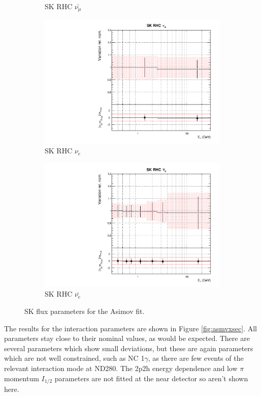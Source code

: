 \begin{figure}[!htbp]
\begin{subfigure}{0.45\textwidth}
  \caption{SK RHC $\bar{\nu_{\mu}}$}
\end{subfigure}
\begin{subfigure}{0.45\textwidth}
  \centering
  \includegraphics[width=0.75\linewidth]{figs/asmvfluxpoly14}
  \caption{SK RHC $\nu_{e}$}
\end{subfigure}
\begin{subfigure}{0.45\textwidth}
  \centering
  \includegraphics[width=0.75\linewidth]{figs/asmvfluxpoly15}
  \caption{SK RHC $\bar{\nu_e}$}
\end{subfigure}
\caption{SK flux parameters for the Asimov fit.}
\label{fig:asmvfluxSK}
\end{figure}

The results for the interaction parameters are shown in Figure \ref{fig:asmvxsec}. All parameters stay close to their nominal values, as would be expected. There are several parameters which show small deviations, but these are again parameters which are not well constrained, such as NC 1$\gamma$, as there are few events of the relevant interaction mode at ND280. The 2p2h energy dependence and low $\pi$ momentum $I_{1/2}$ parameters are not fitted at the near detector so aren't shown here.

